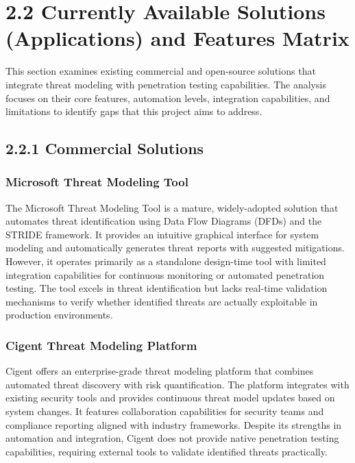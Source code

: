 \documentclass[12pt,a4paper]{report}
\begin{document}
\section{2.2 Currently Available Solutions (Applications) and Features Matrix}

This section examines existing commercial and open-source solutions that integrate threat modeling with penetration testing capabilities. The analysis focuses on their core features, automation levels, integration capabilities, and limitations to identify gaps that this project aims to address.

\subsection{2.2.1 Commercial Solutions}

\subsubsection{Microsoft Threat Modeling Tool}

The Microsoft Threat Modeling Tool is a mature, widely-adopted solution that automates threat identification using Data Flow Diagrams (DFDs) and the STRIDE framework. It provides an intuitive graphical interface for system modeling and automatically generates threat reports with suggested mitigations. However, it operates primarily as a standalone design-time tool with limited integration capabilities for continuous monitoring or automated penetration testing. The tool excels in threat identification but lacks real-time validation mechanisms to verify whether identified threats are actually exploitable in production environments.

\subsubsection{Cigent Threat Modeling Platform}

Cigent offers an enterprise-grade threat modeling platform that combines automated threat discovery with risk quantification. The platform integrates with existing security tools and provides continuous threat model updates based on system changes. It features collaboration capabilities for security teams and compliance reporting aligned with industry frameworks. Despite its strengths in automation and integration, Cigent does not provide native penetration testing capabilities, requiring external tools to validate identified threats practically.
\end{document}
